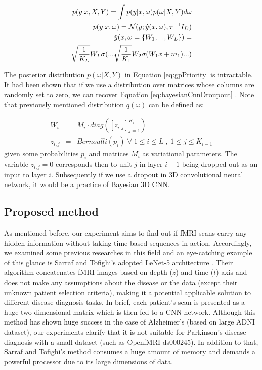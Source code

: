 \documentclass[preprint,12pt]{elsarticle}
\begin{document}
\begin{eqnarray}
\label{eq:gpPriority}
p(y | x,X,Y) = \int p(y|x,\omega) p(\omega|X,Y)d\omega \\ 
p(y|x,\omega) = \mathcal{N} (y ; \hat{y} (x,\omega) , \tau^{-1} I_D )  \nonumber \\
\hat{y} (x, \omega = \{ W_1, ..., W_L \}) =  \nonumber \\
\sqrt{1 \over K_L} W_L \sigma( ...  \sqrt{1 \over K_1} W_2 \sigma( W_1 x + m_1 ) ... )  \nonumber
\end{eqnarray}

The posterior distribution $p(\omega|X,Y)$ in Equation \eqref{eq:gpPriority} is intractable. It had been shown that if we use a distribution over matrices whose columns are randomly set to zero, we can recover Equation \eqref{eq:bayesianCnnDroupout} \cite{Gal2016}. Note that previously mentioned distribution $q(\omega)$ can be defined as:

\begin{eqnarray}
W_i &=& M_i \cdot diag([ z_{i,j} ]^{K_i}_{j=1} ) \nonumber \\ 
z_{i,j} &=& Bernoulli(p_i) \; \forall \; 1 \le i \le L \; , \; 1 \le j \le K_{i-1} \nonumber
\end{eqnarray}
\newline
given some probabilities $p_i$ and matrices $M_i$ as variational parameters. The variable $z_{i,j} = 0$ corresponds then to unit $j$ in layer $i-1$ being dropped out as an input to layer $i$. Subsequently if we use a dropout in 3D convolutional neural network, it would be a practice of Bayesian 3D CNN.





\subsection{Proposed method}
\label{section:proposedMethod}
As mentioned before, our experiment aims to find out if fMRI scans carry any hidden information without taking time-based sequences in action. Accordingly, we examined some previous researches in this field and an eye-catching example of this glance is Sarraf and Tofighi's adopted LeNet-5 architecture \cite{Sarraf2016}. Their algorithm concatenates fMRI images based on depth ($z$) and time ($t$) axis and does not make any assumptions about the disease or the data (except their unknown patient selection criteria), making it a potential applicable solution to different disease diagnosis tasks. In brief, each patient's scan is presented as a huge two-dimensional matrix which is then fed to a CNN network. Although this method has shown huge success in the case of Alzheimer's (based on large ADNI dataset), our experiments clarify that it is not suitable for Parkinson's disease diagnosis with a small dataset (such as OpenfMRI ds000245). In addition to that, Sarraf and Tofighi's method consumes a huge amount of memory and demands a powerful processor due to its large dimensions of data.
\end{document}
